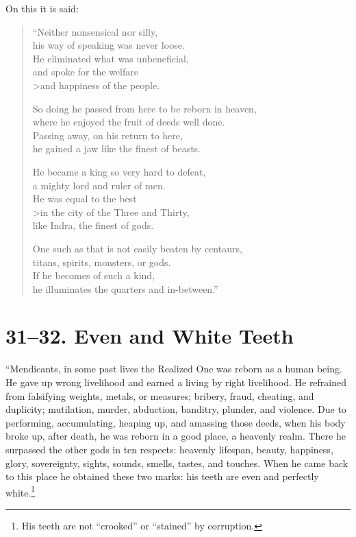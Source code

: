 \documentclass[12pt,openany]{book}%
\begin{document}
On this it is said: 

\begin{verse}%
“Neither nonsensical nor silly, \\
his way of speaking was never loose. \\
He eliminated what was unbeneficial, \\
and spoke for the welfare \\>and happiness of the people. 

So doing he passed from here to be reborn in heaven, \\
where he enjoyed the fruit of deeds well done. \\
Passing away, on his return to here, \\
he gained a jaw like the finest of beasts. 

He became a king so very hard to defeat, \\
a mighty lord and ruler of men. \\
He was equal to the best \\>in the city of the Three and Thirty, \\
like Indra, the finest of gods. 

One such as that is not easily beaten by centaurs, \\
titans, spirits, monsters, or gods. \\
If he becomes of such a kind, \\
he illuminates the quarters and in-between.” 

%
\end{verse}

\section*{31–32. Even and White Teeth }

“Mendicants, in some past lives the Realized One was reborn as a human being. He gave up wrong livelihood and earned a living by right livelihood. He refrained from falsifying weights, metals, or measures; bribery, fraud, cheating, and duplicity; mutilation, murder, abduction, banditry, plunder, and violence. Due to performing, accumulating, heaping up, and amassing those deeds, when his body broke up, after death, he was reborn in a good place, a heavenly realm. There he surpassed the other gods in ten respects: heavenly lifespan, beauty, happiness, glory, sovereignty, sights, sounds, smells, tastes, and touches. When he came back to this place he obtained these two marks: his teeth are even and perfectly white.\footnote{His teeth are not “crooked” or “stained” by corruption. } 
\end{document}
